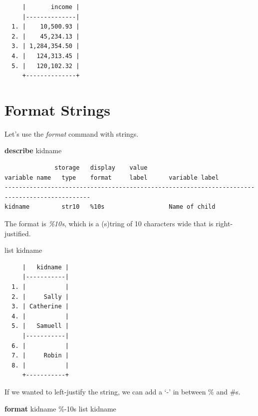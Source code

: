 \documentclass[
]{book}
\newenvironment{Shaded}{\begin{snugshade}}{\end{snugshade}}
\newcommand{\KeywordTok}[1]{\textcolor[rgb]{0.13,0.29,0.53}{\textbf{#1}}}
\newcommand{\NormalTok}[1]{#1}
\newcommand{\OtherTok}[1]{\textcolor[rgb]{0.56,0.35,0.01}{#1}}
\begin{document}
\begin{verbatim}
     |       income |
     |--------------|
  1. |    10,500.93 |
  2. |    45,234.13 |
  3. | 1,284,354.50 |
  4. |   124,313.45 |
  5. |   120,102.32 |
     +--------------+
\end{verbatim}

\section{Format Strings}\label{format-strings}

Let's use the \emph{format} command with strings.

\begin{Shaded}
\begin{Highlighting}[]
\KeywordTok{describe}\NormalTok{ kidname}
\end{Highlighting}
\end{Shaded}

\begin{verbatim}
              storage   display    value
variable name   type    format     label      variable label
----------------------------------------------------------------------------------------------
kidname         str10   %10s                  Name of child
\end{verbatim}

The format is \emph{\%10s}, which is a (s)tring of 10 characters wide that is right-justified.

\begin{Shaded}
\begin{Highlighting}[]
\OtherTok{list}\NormalTok{ kidname}
\end{Highlighting}
\end{Shaded}

\begin{verbatim}
     |   kidname |
     |-----------|
  1. |           |
  2. |     Sally |
  3. | Catherine |
  4. |           |
  5. |   Samuell |
     |-----------|
  6. |           |
  7. |     Robin |
  8. |           |
     +-----------+
\end{verbatim}

If we wanted to left-justify the string, we can add a `-' in between \% and \#s.

\begin{Shaded}
\begin{Highlighting}[]
\KeywordTok{format}\NormalTok{ kidname \%{-}10s}
\OtherTok{list}\NormalTok{ kidname}
\end{Highlighting}
\end{Shaded}
\end{document}
